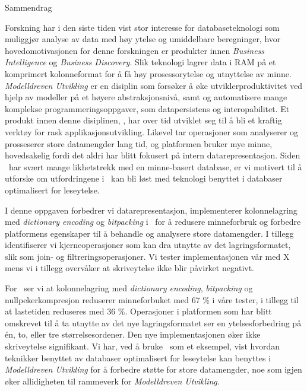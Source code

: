 {\Huge Sammendrag}
\vspace{1cm}

Forskning har i den siste tiden vist stor interesse for databaseteknologi som muliggjør analyse av data med høy ytelse og umiddelbare beregninger, hvor hovedomotivasjonen for denne forskningen er produkter innen \textit{Business Intelligence} og \textit{Business Discovery}. Slik teknologi lagrer data i RAM på et komprimert kolonneformat for å få høy prosessorytelse og utnyttelse av minne. \textit{Modelldreven Utvikling} er en disiplin som forsøker å øke utviklerproduktivitet ved hjelp av modeller på et høyere abstraksjonsnivå, samt og automatisere mange komplekse programmeringsoppgaver, som datapersistens og interopabilitet. Et produkt innen denne disiplinen, \gap, har over tid utviklet seg til å bli et kraftig verktøy for rask applikasjonsutvikling. Likevel tar operasjoner som analyserer og prosseserer store datamengder lang tid, og platformen bruker mye minne, hovedsakelig fordi det aldri har blitt fokusert på intern datarepresentasjon. Siden \gap~har svært mange likhetstrekk med en minne-basert database, er vi motivert til å utforske om utfordringene i \gap~kan bli løst med teknologi benyttet i databaser optimalisert for leseytelse.

I denne oppgaven forbedrer vi datarepresentasjon, implementerer kolonnelagring med \textit{dictionary encoding} og \textit{bitpacking} i \gap~for å redusere minneforbruk og forbedre platformens egenskaper til å behandle og analysere store datamengder. I tillegg identifiserer vi kjerneoperasjoner som kan dra utnytte av det lagringsformatet, slik som join- og filtreringsoperasjoner. Vi tester implementasjonen vår med X mens vi i tillegg overvåker at skriveytelse ikke blir påvirket negativt.

For \gap~ser vi at kolonnelagring med \textit{dictionary encoding}, \textit{bitpacking} og nullpekerkompresjon reduserer minneforbuket med 67 \% i våre tester, i tillegg til at lastetiden reduseres med 36 \%. Operasjoner i platformen som har blitt omskrevet til å ta utnytte av det nye lagringsformatet ser en ytelsesforbedring på én, to, eller tre størrelsesordener. Den nye implementasjonen øker ikke skriveytelse signifikant. Vi har, ved å bruke \gap~som et eksempel, vist hvordan teknikker benyttet av databaser optimalisert for leseytelse kan benyttes i \textit{Modelldreven Utvikling} for å forbedre støtte for store datamengder, noe som igjen øker allidigheten til rammeverk for \textit{Modelldreven Utvikling}. 
